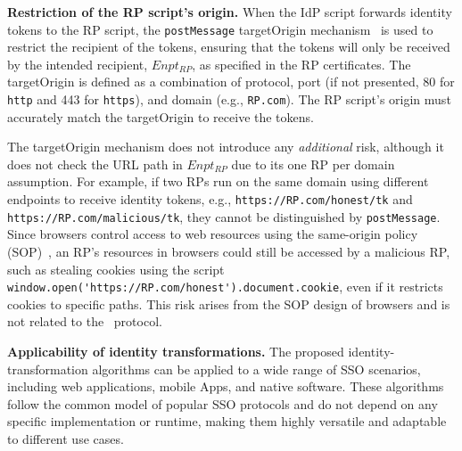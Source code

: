 \noindent \textbf{Restriction of the RP script's origin.}
When the IdP script forwards identity tokens to the RP script, the \verb+postMessage+ targetOrigin mechanism~\cite{postm-targeto} is used to restrict the recipient of the tokens, ensuring that the tokens will only be received by the intended recipient, $Enpt_{RP}$, as specified in the RP certificates. The targetOrigin is defined as a combination of protocol, port (if not presented, 80 for \verb+http+ and 443 for \verb+https+), and domain (e.g., \verb+RP.com+). The RP script's origin must accurately match the targetOrigin to receive the tokens. 

The targetOrigin mechanism does not introduce any {\em additional} risk, although it does not check the URL path in $Enpt_{RP}$ %
due to its one RP per domain assumption. For example, if two RPs run on the same domain using different endpoints to receive identity tokens, e.g., \verb+https://RP.com/honest/tk+ and \verb+https://RP.com/malicious/tk+, they cannot be distinguished by \verb+postMessage+. Since browsers control access to web resources using the same-origin policy (SOP)~\cite{sop}, an RP's resources in browsers could still be accessed by a malicious RP, such as stealing cookies using the script \verb+window.open('https://RP.com/honest').document.cookie+, even if it restricts cookies to specific paths. This risk arises from the SOP design of browsers and is not related to the \usso~protocol.



\noindent \textbf{Applicability of identity transformations.} 
The proposed identity-transformation algorithms %
can be applied to a wide range of SSO scenarios, including web applications, mobile Apps, and native software. These algorithms follow the common model of popular SSO protocols and do not depend on any specific implementation or runtime, making them highly versatile and adaptable to different use cases.




